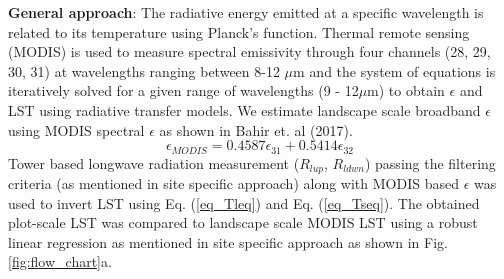 \documentclass[fleqn,10pt]{wlscirep}
\begin{document}
\textbf{General approach}:
The radiative energy emitted at a specific wavelength is related to its temperature using Planck's function\cite{wang_estimation_2005-1}. Thermal remote sensing (MODIS) is used to measure spectral emissivity through four channels (28, 29, 30, 31) at wavelengths ranging between 8-12 $\mu$m \cite{jin_improved_2006-1} and the system of equations is iteratively solved for a given range of wavelengths (9 - 12$\mu$m) to obtain $\epsilon$ and LST using radiative transfer models\cite{hulley_quantifying_2012-1,jin2006improved,wang_evaluation_2009}. We estimate landscape scale broadband $\epsilon$ using MODIS spectral $\epsilon$ as shown in Bahir et. al (2017)\cite{bahir_evaluation_2017}.
\begin{equation}\label{eq_emodis}
\epsilon_{MODIS}= 0.4587 \epsilon_{31} + 0.5414 \epsilon_{32}
\end{equation}
Tower based longwave radiation measurement ($R_{lup}$, $R_{ldwn}$) passing the filtering criteria (as mentioned in site specific approach) along with MODIS based $\epsilon$ was used to invert LST using Eq. (\ref{eq_Tleq}) and  Eq. (\ref{eq_Tseq}). The obtained plot-scale LST was compared to landscape scale MODIS LST using a robust linear regression as mentioned in site specific approach as shown in Fig. \ref{fig:flow_chart}a.

\end{document}
